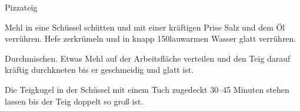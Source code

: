 \begin{recipe}{Pizzateig}

    \begin{ingredients}
    \end{ingredients}

    \begin{instructions}
        Mehl in eine Schüssel schütten und mit einer kräftigen Prise Salz und dem Öl verrühren.
        Hefe zerkrümeln und in knapp 150\milliliter lauwarmen Wasser glatt verrühren.

        Durchmischen. Etwas Mehl auf der Arbeitsfläche verteilen und den Teig darauf kräftig durchkneten bis er geschmeidig und glatt ist.

        Die Teigkugel in der Schüssel mit einem Tuch zugedeckt 30--45 Minuten stehen lassen bis der Teig doppelt so groß ist.
    \end{instructions}
\end{recipe}
